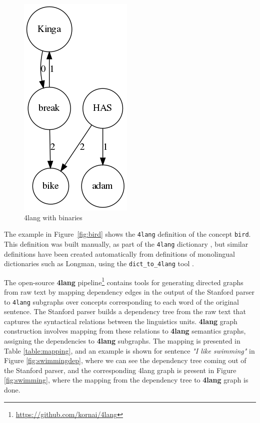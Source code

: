 \begin{figure}[h]
	\centering
	\includegraphics[height=0.5\textwidth]{figures/binary4lang}
	\caption{4lang with binaries}
	\label{fig:4langbin}
\end{figure}

The example in
Figure~\ref{fig:bird} shows the \texttt{4lang} definition of the
concept \texttt{bird}. This definition was built manually, as part of
the \texttt{4lang} dictionary \cite{Kornai:2013}, but similar
definitions have been created automatically from definitions of
monolingual dictionaries such as Longman, using the
\texttt{dict\_to\_4lang} tool \cite{Recski:2016d}.

The open-source \textbf{4lang} pipeline\footnote{\url{https://github.com/kornai/4lang}}
contains tools for generating
directed graphs from raw text by mapping dependency edges in the output of the
Stanford parser \cite{deMarneffe:2006} to \texttt{4lang} subgraphs over
concepts corresponding to each word of the original sentence. The Stanford parser builds a dependency tree from the raw text that captures the syntactical relations between the linguistics units. \textbf{4lang} graph construction involves mapping from these relations to \textbf{4lang} semantics graphs, assigning the dependencies to \textbf{4lang} subgraphs. The mapping is presented in Table \ref{table:mapping}, and an example is shown for sentence \textit{"I like swimming"} in Figure \ref{fig:swimmingdep}, where we can see the dependency tree coming out of the Stanford parser, and the corresponding 4lang graph is present in Figure \ref{fig:swimming}, where the mapping from the dependency tree to \textbf{4lang} graph is done. 

